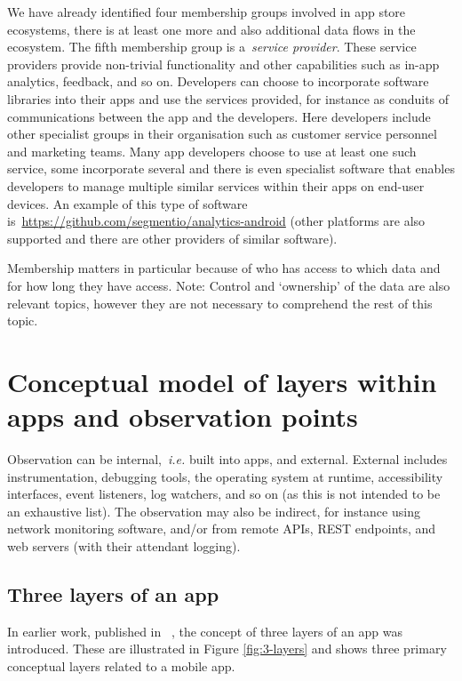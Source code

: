 We have already identified four membership groups involved in app store ecosystems, there is at least one more and also additional data flows in the ecosystem. The fifth membership group is a~\emph{service provider}. These service providers provide non-trivial functionality and other capabilities such as in-app analytics, feedback, and so on. Developers can choose to incorporate software libraries into their apps and use the services provided, for instance as conduits of communications between the app and the developers. Here developers include other specialist groups in their organisation such as customer service personnel and marketing teams. Many app developers choose to use at least one such service, some incorporate several and there is even specialist software that enables developers to manage multiple similar services within their apps on end-user devices. An example of this type of software is~\url{https://github.com/segmentio/analytics-android} (other platforms are also supported and there are other providers of similar software).

Membership matters in particular because of who has access to which data and for how long they have access. Note: Control and `ownership' of the data are also relevant topics, however they are not necessary to comprehend the rest of this topic. %

\section{Conceptual model of layers within apps and observation points}
Observation can be internal,~\emph{i.e.} built into apps, and external. External includes instrumentation, debugging tools, the operating system at runtime, accessibility interfaces, event listeners, log watchers, and so on (as this is not intended to be an exhaustive list). The observation may also be indirect, for instance using network monitoring software, and/or from remote APIs, REST endpoints, and web servers (with their attendant logging).

\subsection{Three layers of an app}
In earlier work, published in ~\citep{harty_aymer_playbook_2016}, the concept of three layers of an app was introduced. These are illustrated in Figure \ref{fig:3-layers} and shows three primary conceptual layers related to a mobile app. 

